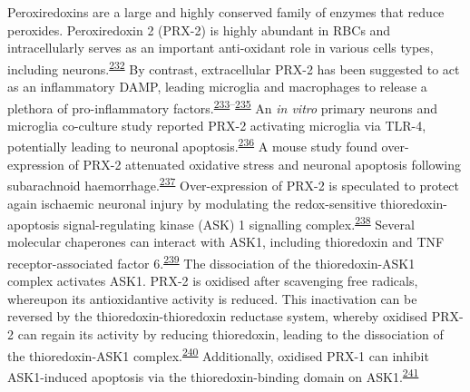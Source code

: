 \documentclass[
]{article}
\begin{document}
Peroxiredoxins are a large and highly conserved family of enzymes that reduce peroxides.
Peroxiredoxin 2 (PRX-2) is highly abundant in RBCs and intracellularly serves as an important anti-oxidant role in various cells types, including neurons.\textsuperscript{\protect\hyperlink{ref-low_peroxiredoxin_2008}{232}}
By contrast, extracellular PRX-2 has been suggested to act as an inflammatory DAMP, leading microglia and macrophages to release a plethora of pro-inflammatory factors.\textsuperscript{\protect\hyperlink{ref-salzano_linkage_2014}{233}--\protect\hyperlink{ref-shichita_peroxiredoxin_2012}{235}}
An \emph{in vitro} primary neurons and microglia co-culture study reported PRX-2 activating microglia via TLR-4, potentially leading to neuronal apoptosis.\textsuperscript{\protect\hyperlink{ref-lu_peroxiredoxin_2018}{236}}
A mouse study found over-expression of PRX-2 attenuated oxidative stress and neuronal apoptosis following subarachnoid haemorrhage.\textsuperscript{\protect\hyperlink{ref-lu_peroxiredoxin_2019}{237}}
Over-expression of PRX-2 is speculated to protect again ischaemic neuronal injury by modulating the redox-sensitive thioredoxin-apoptosis signal-regulating kinase (ASK) 1 signalling complex.\textsuperscript{\protect\hyperlink{ref-gan_transgenic_2012}{238}}
Several molecular chaperones can interact with ASK1, including thioredoxin and TNF receptor-associated factor 6.\textsuperscript{\protect\hyperlink{ref-matsuzawa_ros-dependent_2005}{239}}
The dissociation of the thioredoxin-ASK1 complex activates ASK1.
PRX-2 is oxidised after scavenging free radicals, whereupon its antioxidantive activity is reduced.
This inactivation can be reversed by the thioredoxin-thioredoxin reductase system, whereby oxidised PRX-2 can regain its activity by reducing thioredoxin, leading to the dissociation of the thioredoxin-ASK1 complex.\textsuperscript{\protect\hyperlink{ref-rhee_multiple_2011}{240}}
Additionally, oxidised PRX-1 can inhibit ASK1-induced apoptosis via the thioredoxin-binding domain on ASK1.\textsuperscript{\protect\hyperlink{ref-kim_novel_2008}{241}}
\end{document}
